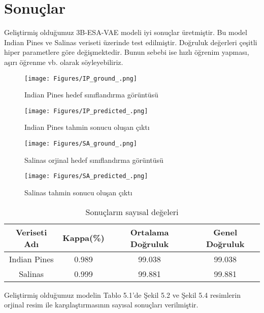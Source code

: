 \chapter{Sonuçlar}

Geliştirmiş olduğumuz 3B-ESA-VAE modeli iyi sonuçlar üretmiştir.
Bu model Indian Pines ve Salinas veriseti üzerinde test edilmiştir. Doğruluk değerleri çeşitli
hiper parametlere göre değişmektedir. Bunun sebebi ise hızlı öğrenim yapması, aşırı öğrenme vb. olarak 
söyleyebiliriz.

\vspace{3cm}
\begin{figure}[!ht]
    \begin{minipage}[c]{0.4\linewidth}
        \captionsetup{format=hang}
        \texttt{[image: Figures/IP\_ground\_.png]}
        \caption{Indian Pines hedef sınıflandırma görüntüsü }
        \end{minipage}
    \hfill
        \begin{minipage}[c]{0.4\linewidth}
        \captionsetup{format=hang}
        \texttt{[image: Figures/IP\_predicted\_.png]}
        \caption{Indian Pines tahmin sonucu oluşan çıktı }
    \end{minipage}%
\end{figure}

\begin{figure}[!ht]
    \begin{minipage}[c]{0.4\linewidth}
        \captionsetup{format=hang}
        \texttt{[image: Figures/SA\_ground\_.png]}
        \caption{Salinas orjinal hedef sınıflandırma görüntüsü }
        \end{minipage}
    \hfill
        \begin{minipage}[c]{0.4\linewidth}
        \captionsetup{format=hang}
        \texttt{[image: Figures/SA\_predicted\_.png]}
        \caption{Salinas tahmin sonucu oluşan çıktı }
    \end{minipage}%
\end{figure}
\newpage

\vspace{2cm}
\begin{table}[!ht]
\centering
    \begin{threeparttable} %
    \caption{Sonuçların sayısal değeleri}
        \begin{tabular}{|c|c|c|c|}
        \hline
        \textbf{Veriseti Adı} & \textbf{Kappa(\%)} & \textbf{Ortalama Doğruluk} & \textbf{Genel Doğruluk} \\ \hline
        Indian Pines & 0.989    & 99.038           & 99.038         \\ \hline
        Salinas & 0.999    & 99.881          & 99.881         \\ \hline
        \end{tabular}
    \end{threeparttable} %
\end{table}

Geliştirmiş olduğumuz modelin Tablo 5.1'de Şekil 5.2 ve Şekil 5.4 resimlerin orjinal resim ile karşılaştırmasının sayısal sonuçları verilmiştir.

